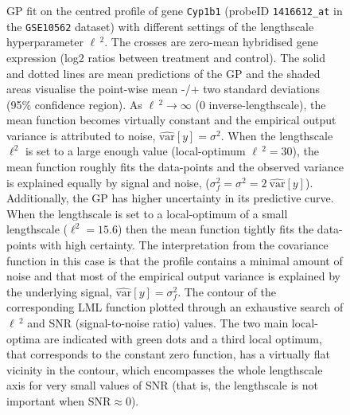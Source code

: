       \begin{figure}[!htbp]
	\centering
	\caption[GP fits on the expression profile of gene \texttt{Cyp1b1}.]{ \label{fig:GPfit}
	  \textbf{} GP fit on the centred profile of
	  gene \texttt{Cyp1b1} (probeID \texttt{1416612\_at} in the \texttt{GSE10562} dataset)
	  with different settings of the lengthscale hyperparameter $\ell\,^2$.
	  The crosses are zero-mean hybridised gene expression (log2 ratios between
	  treatment and control). The solid and dotted lines are mean predictions of the GP and the shaded areas
	  visualise the point-wise mean -/+ two standard deviations (95\% confidence
	  region).
	  As $\ell\,^2 \rightarrow \infty$ (0 inverse-lengthscale), the mean
	  function becomes virtually constant and the empirical output variance
	  is attributed to noise, $\hat{\textrm{var}}[y] = \sigma^2$.
	  When the lengthscale $\ell^2$ is set to a large enough value (local-optimum  $\ell\,^2 = 30$),
	  the mean function roughly fits the data-points and the observed variance is
	  explained equally by signal and noise, ($\sigma_f^2 = \sigma^2 = 2~\hat{\textrm{var}}[y]$).
	  Additionally, the GP has higher uncertainty in its predictive curve.
	  When the lengthscale is set to a local-optimum of a small lengthscale ($\ell^2 = 15.6$)
	  then the mean function tightly fits the data-points with high certainty. The
	  interpretation from the covariance function in this case is that the profile
	  contains a minimal amount of noise and that most of the empirical output variance
	  is explained by the underlying signal, $\hat{\textrm{var}}[y] = \sigma_f^2$.
	  \textbf{} The contour
	  of the corresponding LML function plotted through an exhaustive search of
	  $\ell\,^2$ and SNR (signal-to-noise ratio) values. The two main local-optima are
	  indicated with green dots and a third local optimum, that corresponds to the
	  constant zero function, has a virtually flat vicinity in the contour, which
	  encompasses the whole lengthscale axis for very small values of SNR (that is, the
	  lengthscale is not important when SNR$\approx0$).
	}
      \end{figure}

